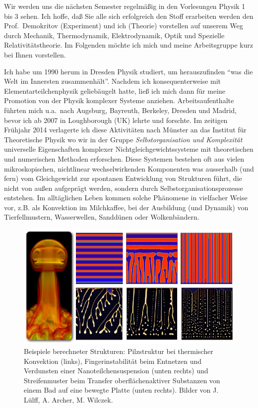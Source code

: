 \documentclass[twocolumn,a4paper,10pt]{article}
\begin{document}
%
Wir werden uns die n\"achsten Semester regelm\"a{\ss}ig in den Vorlesungen Physik 1 bis 3 sehen.  Ich hoffe, da{\ss} Sie alle sich erfolgreich den Stoff erarbeiten werden den Prof.\ Demokritov (Experiment) und ich (Theorie) vorstellen auf unserem Weg durch Mechanik, Thermodynamik, Elektrodynamik, Optik und Spezielle Relativit\"atstheorie.  Im Folgenden m\"ochte ich mich und meine Arbeitsgruppe kurz bei Ihnen vorstellen.

Ich habe um 1990 herum in Dresden Physik studiert, um herauszufinden ``was die Welt im Innersten zusammenh\"alt''. Nachdem ich konsequenterweise mit Elementarteilchenphysik gelieb\"augelt hatte, lie{\ss} ich mich dann f\"ur meine Promotion von der Physik komplexer Systeme anziehen. Arbeitsaufenthalte f\"uhrten mich u.a.\ nach Augsburg, Bayreuth, Berkeley, Dresden und Madrid, bevor ich ab 2007 in Loughborough (UK) lehrte und forschte. Im zeitigen Fr\"uhjahr 2014 verlagerte ich diese Aktivit\"aten nach M\"unster an das Institut f\"ur Theoretische Physik wo wir in der Gruppe \textit{Selbstorganisation und Komplexit\"at} universelle Eigenschaften komplexer Nichtgleichgewichtssysteme mit theoretischen und numerischen Methoden erforschen.  Diese Systemen bestehen oft aus vielen mikroskopischen, nichtlinear wechselwirkenden Komponenten was ausserhalb (und fern) vom Gleichgewicht zur spontanen Entwicklung von Strukturen f\"uhrt, die nicht von au{\ss}en aufgepr\"agt werden, sondern durch Selbstorganisationsprozesse entstehen.  Im allt\"aglichen Leben kommen solche Ph\"anomene in vielfacher Weise vor, z.B. als Konvektion im Milchkaffee, bei der Ausbildung (und Dynamik) von Tierfellmustern, Wasserwellen, Sandd\"unen oder Wolkenb\"andern.

\begin{figure}[tbh]
\includegraphics[width=\hsize]{g3184}
\caption{Beispiele berechneter Strukturen: Pilzstruktur bei thermischer Konvektion (links), Fingerinstabilit\"at beim Entnetzen und Verdunsten einer Nanoteilchensuspension (unten rechts) und Streifenmuster beim Transfer oberfl\"achenaktiver Substanzen von einem Bad auf eine bewegte Platte (unten rechts). Bilder von J. L\"ulff, A. Archer, M. Wilczek.
}
\label{fig:examples}
\end{figure}
\end{document}
